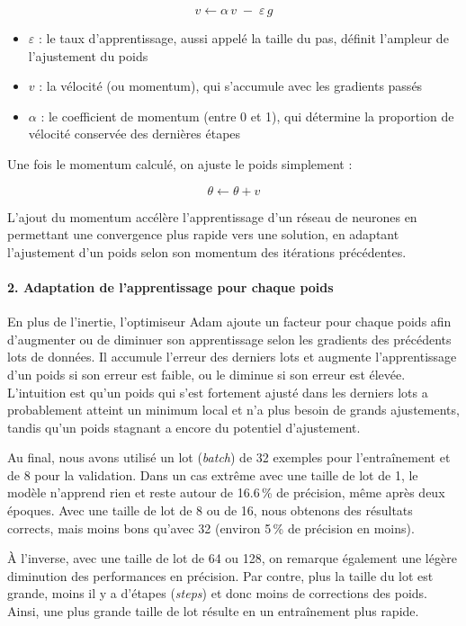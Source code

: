 \documentclass{article}
\begin{document}
\[
v \leftarrow \alpha \, v \;-\; \varepsilon \, g
\]

\begin{itemize}
    \item $\varepsilon$ : le taux d’apprentissage, aussi appelé la taille du pas, définit l’ampleur de l’ajustement du poids
    \item $v$ : la vélocité (ou momentum), qui s’accumule avec les gradients passés
    \item $\alpha$ : le coefficient de momentum (entre 0 et 1), qui détermine la proportion de vélocité conservée des dernières étapes
\end{itemize}

Une fois le momentum calculé, on ajuste le poids simplement :

\[
\theta \leftarrow \theta + v
\]

L’ajout du momentum accélère l’apprentissage d’un réseau de neurones en permettant une convergence plus rapide vers une solution, en adaptant l’ajustement d’un poids selon son momentum des itérations précédentes.

\paragraph{2. Adaptation de l'apprentissage pour chaque poids}

En plus de l’inertie, l’optimiseur Adam ajoute un facteur pour chaque poids afin d’augmenter ou de diminuer son apprentissage selon les gradients des précédents lots de données. Il accumule l’erreur des derniers lots et augmente l’apprentissage d’un poids si son erreur est faible, ou le diminue si son erreur est élevée. L’intuition est qu’un poids qui s’est fortement ajusté dans les derniers lots a probablement atteint un minimum local et n’a plus besoin de grands ajustements, tandis qu’un poids stagnant a encore du potentiel d’ajustement.

Au final, nous avons utilisé un lot (\emph{batch}) de 32 exemples pour l'entraînement et de 8 pour la validation. Dans un cas extrême avec une taille de lot de 1, le modèle n’apprend rien et reste autour de 16.6\,\% de précision, même après deux époques. Avec une taille de lot de 8 ou de 16, nous obtenons des résultats corrects, mais moins bons qu’avec 32 (environ 5\,\% de précision en moins).

À l’inverse, avec une taille de lot de 64 ou 128, on remarque également une légère diminution des performances en précision. Par contre, plus la taille du lot est grande, moins il y a d’étapes (\emph{steps}) et donc moins de corrections des poids. Ainsi, une plus grande taille de lot résulte en un entraînement plus rapide.
\end{document}
